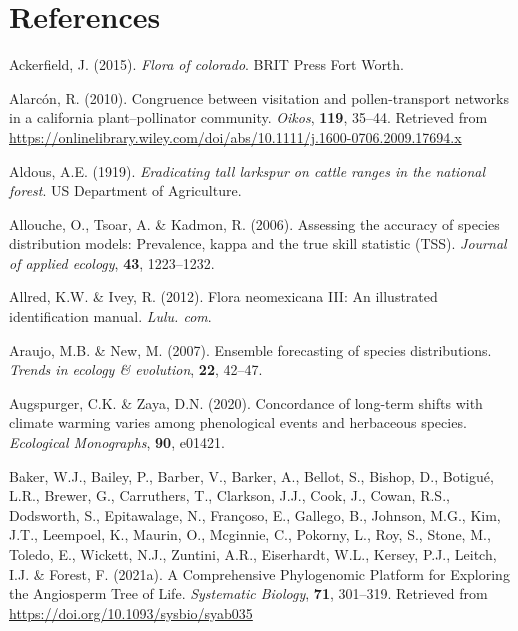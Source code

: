 \documentclass[
]{article}
\newlength{\cslhangindent}
\newlength{\cslentryspacingunit} %
\newenvironment{CSLReferences}[2] %
 {%
  \setlength{\parindent}{0pt}
  \ifodd #1
  \let\oldpar\par
  \def\par{\hangindent=\cslhangindent\oldpar}
  \fi
  \setlength{\parskip}{#2\cslentryspacingunit}
 }%
 {}
\begin{document}
\newpage

\hypertarget{references-1}{%
\section*{References}\label{references-1}}

\hypertarget{refs}{}
\begin{CSLReferences}{1}{0}
\leavevmode{}%
Ackerfield, J. (2015). \emph{Flora of colorado}. BRIT Press Fort Worth.

\leavevmode{}%
Alarcón, R. (2010). Congruence between visitation and pollen-transport
networks in a california plant--pollinator community. \emph{Oikos},
\textbf{119}, 35--44. Retrieved from
\url{https://onlinelibrary.wiley.com/doi/abs/10.1111/j.1600-0706.2009.17694.x}

\leavevmode{}%
Aldous, A.E. (1919). \emph{Eradicating tall larkspur on cattle ranges in
the national forest}. US Department of Agriculture.

\leavevmode{}%
Allouche, O., Tsoar, A. \& Kadmon, R. (2006). Assessing the accuracy of
species distribution models: Prevalence, kappa and the true skill
statistic (TSS). \emph{Journal of applied ecology}, \textbf{43},
1223--1232.

\leavevmode{}%
Allred, K.W. \& Ivey, R. (2012). Flora neomexicana III: An illustrated
identification manual. \emph{Lulu. com}.

\leavevmode{}%
Araujo, M.B. \& New, M. (2007). Ensemble forecasting of species
distributions. \emph{Trends in ecology \& evolution}, \textbf{22},
42--47.

\leavevmode{}%
Augspurger, C.K. \& Zaya, D.N. (2020). Concordance of long-term shifts
with climate warming varies among phenological events and herbaceous
species. \emph{Ecological Monographs}, \textbf{90}, e01421.

\leavevmode{}%
Baker, W.J., Bailey, P., Barber, V., Barker, A., Bellot, S., Bishop, D.,
Botigué, L.R., Brewer, G., Carruthers, T., Clarkson, J.J., Cook, J.,
Cowan, R.S., Dodsworth, S., Epitawalage, N., Françoso, E., Gallego, B.,
Johnson, M.G., Kim, J.T., Leempoel, K., Maurin, O., Mcginnie, C.,
Pokorny, L., Roy, S., Stone, M., Toledo, E., Wickett, N.J., Zuntini,
A.R., Eiserhardt, W.L., Kersey, P.J., Leitch, I.J. \& Forest, F.
(2021a). {A Comprehensive Phylogenomic Platform for Exploring the
Angiosperm Tree of Life}. \emph{Systematic Biology}, \textbf{71},
301--319. Retrieved from \url{https://doi.org/10.1093/sysbio/syab035}


\end{CSLReferences}
\end{document}

